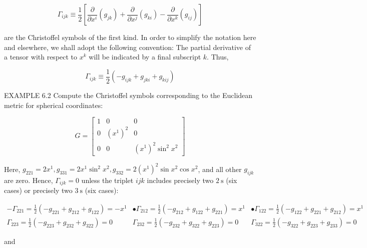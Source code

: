 \documentclass[10pt]{article}
\begin{document}
\begin{equation*}
\Gamma_{i j k} \equiv \frac{1}{2}\left[\frac{\partial}{\partial x^{i}}\left(g_{j k}\right)+\frac{\partial}{\partial x^{j}}\left(g_{k i}\right)-\frac{\partial}{\partial x^{k}}\left(g_{i j}\right)\right] \tag{6.1a}
\end{equation*}


are the Christoffel symbols of the first kind. In order to simplify the notation here and elsewhere, we shall adopt the following convention: The partial derivative of a tensor with respect to $x^{k}$ will be indicated by a final subscript $k$. Thus,


\begin{equation*}
\Gamma_{i j k} \equiv \frac{1}{2}\left(-g_{i j k}+g_{j k i}+g_{k i j}\right) \tag{6.1b}
\end{equation*}


EXAMPLE 6.2 Compute the Christoffel symbols corresponding to the Euclidean metric for spherical coordinates:

$$
G=\left[\begin{array}{ccc}
1 & 0 & 0 \\
0 & \left(x^{1}\right)^{2} & 0 \\
0 & 0 & \left(x^{1}\right)^{2} \sin ^{2} x^{2}
\end{array}\right]
$$

Here, $g_{221}=2 x^{1}, g_{331}=2 x^{1} \sin ^{2} x^{2}, g_{332}=2\left(x^{1}\right)^{2} \sin x^{2} \cos x^{2}$, and all other $g_{i j k}$ are zero. Hence, $\Gamma_{i j k}=0$ unless the triplet $i j k$ includes precisely two $2 \mathrm{~s}$ (six cases) or precisely two $3 \mathrm{~s}$ (six cases):

$$
\begin{aligned}
-\Gamma_{221}=\frac{1}{2}\left(-g_{221}+g_{212}+g_{122}\right)=-x^{1} & \bullet \Gamma_{212}=\frac{1}{2}\left(-g_{212}+g_{122}+g_{221}\right)=x^{1} & \bullet \Gamma_{122}=\frac{1}{2}\left(-g_{122}+g_{221}+g_{212}\right)=x^{1} \\
\Gamma_{223}=\frac{1}{2}\left(-g_{223}+g_{232}+g_{322}\right)=0 & \Gamma_{232}=\frac{1}{2}\left(-g_{232}+g_{322}+g_{223}\right)=0 & \Gamma_{322}=\frac{1}{2}\left(-g_{322}+g_{223}+g_{233}\right)=0
\end{aligned}
$$

and
\end{document}
